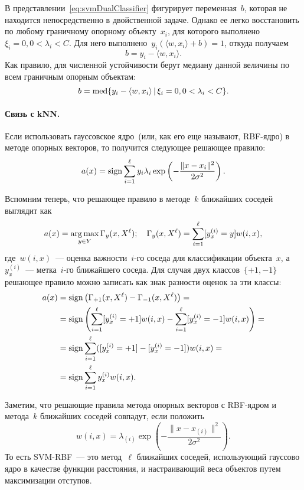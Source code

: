 \documentclass[12pt,fleqn]{article}
\begin{document}
В представлении~\eqref{eq:svmDualClassifier} фигурирует переменная~$b$,
которая не находится непосредственно в двойственной задаче.
Однако ее легко восстановить по любому граничному опорному объекту~$x_i$,
для которого выполнено~$\xi_i = 0, 0 < \lambda_i < C$.
Для него выполнено~$y_i \left(\langle w, x_i \rangle + b \right) = 1$,
откуда получаем
\[
    b = y_i - \langle w, x_i \rangle.
\]
Как правило, для численной устойчивости берут медиану данной величины по
всем граничным опорным объектам:
\[
    b = \mathop{\rm med}\limits \{ y_i - \langle w, x_i \rangle \mspace{3mu}{|}\mspace{3mu} \xi_i = 0, 0 < \lambda_i < C \}.
\]

\paragraph{Связь с kNN.}
Если использовать гауссовское ядро~(или, как его еще называют, RBF-ядро)
в методе опорных векторов, то получится следующее решающее правило:
\[
    a(x)
    =
    \mathop{\rm sign}\limits
    \sum_{i = 1}^{\ell}
        y_i \lambda_i
        \exp\left(
            -\frac{
                \|x - x_i\|^2
            }{
                2 \sigma^2
            }
        \right).
\]

Вспомним теперь, что решающее правило в методе~$k$ ближайших соседей выглядит как
\[
    a(x)
    =
    \mathop{\rm arg\,max}\limits_{y \in Y}
        \Gamma_y(x, X^\ell);
    \quad
    \Gamma_y(x, X^\ell)
    =
    \sum_{i = 1}^{\ell}
        [y^{(i)}_x = y]
        w(i, x),
\]
где~$w(i, x)$~--- оценка важности~$i$-го соседа для классификации объекта~$x$,
а~$y^{(i)}_x$~--- метка~$i$-го ближайшего соседа.
Для случая двух классов~$\{+1, -1\}$ решающее правило можно записать
как знак разности оценок за эти классы:
\begin{align*}
    a(x)
    &=
    \mathop{\rm sign}\limits\left(
        \Gamma_{+1}(x, X^\ell)
        -
        \Gamma_{-1}(x, X^\ell)
    \right)
    =\\
    &=
    \mathop{\rm sign}\limits\left(
        \sum_{i = 1}^{\ell}
            [y^{(i)}_x = +1]
            w(i, x)
        -
        \sum_{i = 1}^{\ell}
            [y^{(i)}_x = -1]
            w(i, x)
    \right)
    =\\
    &=
    \mathop{\rm sign}\limits \sum_{i = 1}^{\ell}
        ([y^{(i)}_x = +1] - [y^{(i)}_x = -1])
        w(i, x)
    =\\
    &=
    \mathop{\rm sign}\limits \sum_{i = 1}^{\ell}
        y^{(i)}_x
        w(i, x).
\end{align*}

Заметим, что решающие правила метода опорных векторов с RBF-ядром
и метода~$k$ ближайших соседей совпадут, если положить
\[
    w(i, x)
    =
    \lambda_{(i)}
    \exp\left(
        -\frac{
            \|x - x_{(i)}\|^2
        }{
           2 \sigma^2
        }
    \right).
\]
То есть SVM-RBF~--- это метод~$\ell$ ближайших соседей,
использующий гауссово ядро в качестве функции расстояния,
и настраивающий веса объектов путем максимизации отступов.
\end{document}
